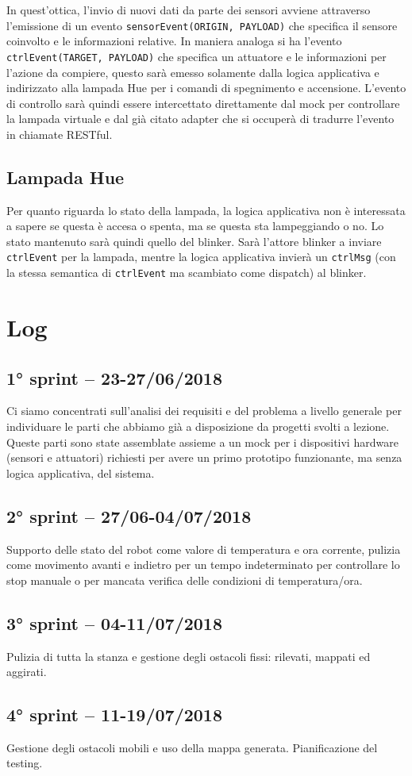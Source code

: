 In quest'ottica, l'invio di nuovi dati da parte dei sensori avviene attraverso l'emissione di un evento \texttt{sensorEvent(ORIGIN, PAYLOAD)} che specifica il sensore coinvolto e le informazioni relative. In maniera analoga si ha l'evento \texttt{ctrlEvent(TARGET, PAYLOAD)} che specifica un attuatore e le informazioni per l'azione da compiere, questo sarà emesso solamente dalla logica applicativa e indirizzato alla lampada Hue per i comandi di spegnimento e accensione. L'evento di controllo sarà quindi essere intercettato direttamente dal mock per controllare la lampada virtuale e dal già citato adapter che si occuperà di tradurre l'evento in chiamate RESTful.

\subsection{Lampada Hue}
Per quanto riguarda lo stato della lampada, la logica applicativa non è interessata a sapere se questa è accesa o spenta, ma se questa sta lampeggiando o no. Lo stato mantenuto sarà quindi quello del blinker. Sarà l'attore blinker a inviare \texttt{ctrlEvent} per la lampada, mentre la logica applicativa invierà un \texttt{ctrlMsg} (con la stessa semantica di \texttt{ctrlEvent} ma scambiato come dispatch) al blinker.

\section{Log}

\subsection{1° sprint -- 23-27/06/2018}
Ci siamo concentrati sull'analisi dei requisiti e del problema a livello generale per individuare le parti che abbiamo già a disposizione da progetti svolti a lezione. Queste parti sono state assemblate assieme a un mock per i dispositivi hardware (sensori e attuatori) richiesti per avere un primo prototipo funzionante, ma senza logica applicativa, del sistema.

\subsection{2° sprint -- 27/06-04/07/2018}
Supporto delle stato del robot come valore di temperatura e ora corrente, pulizia come movimento avanti e indietro per un tempo indeterminato per controllare lo stop manuale o per mancata verifica delle condizioni di temperatura/ora.

\subsection{3° sprint -- 04-11/07/2018}
Pulizia di tutta la stanza e gestione degli ostacoli fissi: rilevati, mappati ed aggirati.

\subsection{4° sprint -- 11-19/07/2018}
Gestione degli ostacoli mobili e uso della mappa generata. Pianificazione del testing.


